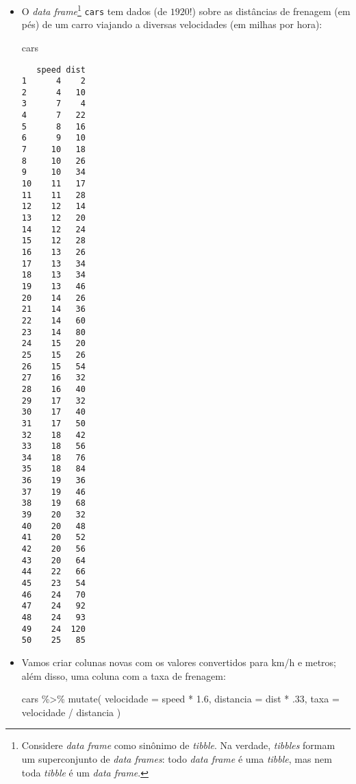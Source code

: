 \documentclass[
  letterpaper,
  DIV=11,
  numbers=noendperiod]{scrreprt}
\newenvironment{Shaded}{\begin{snugshade}}{\end{snugshade}}
\newcommand{\AttributeTok}[1]{\textcolor[rgb]{0.40,0.45,0.13}{#1}}
\newcommand{\DecValTok}[1]{\textcolor[rgb]{0.68,0.00,0.00}{#1}}
\newcommand{\FloatTok}[1]{\textcolor[rgb]{0.68,0.00,0.00}{#1}}
\newcommand{\FunctionTok}[1]{\textcolor[rgb]{0.28,0.35,0.67}{#1}}
\newcommand{\NormalTok}[1]{\textcolor[rgb]{0.00,0.23,0.31}{#1}}
\newcommand{\SpecialCharTok}[1]{\textcolor[rgb]{0.37,0.37,0.37}{#1}}
\begin{document}
\begin{itemize}
\item
  O \emph{data frame}\footnote{Considere \emph{data frame} como sinônimo
    de \emph{tibble}. Na verdade, \emph{tibbles} formam um superconjunto
    de \emph{data frames}: todo \emph{data frame} é uma \emph{tibble},
    mas nem toda \emph{tibble} é um \emph{data frame}.} \texttt{cars}
  tem dados (de $1920$!) sobre as distâncias de frenagem (em pés) de um
  carro viajando a diversas velocidades (em milhas por hora):

\begin{Shaded}
\begin{Highlighting}[]
\NormalTok{cars}
\end{Highlighting}
\end{Shaded}

\begin{verbatim}
   speed dist
1      4    2
2      4   10
3      7    4
4      7   22
5      8   16
6      9   10
7     10   18
8     10   26
9     10   34
10    11   17
11    11   28
12    12   14
13    12   20
14    12   24
15    12   28
16    13   26
17    13   34
18    13   34
19    13   46
20    14   26
21    14   36
22    14   60
23    14   80
24    15   20
25    15   26
26    15   54
27    16   32
28    16   40
29    17   32
30    17   40
31    17   50
32    18   42
33    18   56
34    18   76
35    18   84
36    19   36
37    19   46
38    19   68
39    20   32
40    20   48
41    20   52
42    20   56
43    20   64
44    22   66
45    23   54
46    24   70
47    24   92
48    24   93
49    24  120
50    25   85
\end{verbatim}
\item
  Vamos criar colunas novas com os valores convertidos para km/h e
  metros; além disso, uma coluna com a taxa de frenagem:

\begin{Shaded}
\begin{Highlighting}[]
\NormalTok{cars }\SpecialCharTok{\%\textgreater{}\%} 
  \FunctionTok{mutate}\NormalTok{(}
    \AttributeTok{velocidade =}\NormalTok{ speed }\SpecialCharTok{*} \FloatTok{1.6}\NormalTok{,}
    \AttributeTok{distancia =}\NormalTok{ dist }\SpecialCharTok{*}\NormalTok{ .}\DecValTok{33}\NormalTok{,}
    \AttributeTok{taxa =}\NormalTok{ velocidade }\SpecialCharTok{/}\NormalTok{ distancia}
\NormalTok{  )}
\end{Highlighting}
\end{Shaded}


\end{itemize}
\end{document}
